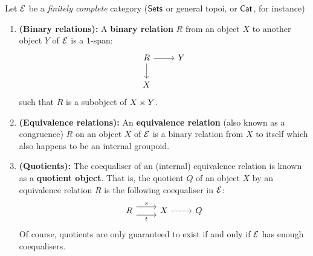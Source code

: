                     \begin{definition} \label{def: equivalence_relations}
                        Let $\mathcal{E}$ be a \textit{finitely complete} category ($\mathsf{Sets}$ or general topoi, or $\mathsf{Cat}$, for instance)
                            \begin{enumerate}
                                \item \textbf{(Binary relations):} A \textbf{binary relation} $R$ from an object $X$ to another object $Y$ of $\mathcal{E}$ is a $1$-span:
                                    $$
                                        \begin{tikzcd}
                                        	R & Y \\
                                        	X
                                        	\arrow[from=1-1, to=2-1]
                                        	\arrow[from=1-1, to=1-2]
                                        \end{tikzcd}
                                    $$
                                such that $R$ is a subobject of $X \x Y$. 
                                \item \textbf{(Equivalence relations):} An \textbf{equivalence relation} (also known as a congruence) $R$ on an object $X$ of $\mathcal{E}$ is a binary relation from $X$ to itself which also happens to be an internal groupoid. 
                                \item \textbf{(Quotients):} The coequaliser of an (internal) equivalence relation is known as a \textbf{quotient object}. That is, the quotient $Q$ of an object $X$ by an equivalence relation $R$ is the following coequaliser in $\mathcal{E}$:
                                    $$
                                        \begin{tikzcd}
                                        	R & X & Q
                                        	\arrow["s", shift left=2, from=1-1, to=1-2]
                                        	\arrow["t"', shift right=2, from=1-1, to=1-2]
                                        	\arrow[dashed, from=1-2, to=1-3]
                                        \end{tikzcd}
                                    $$
                                Of course, quotients are only guaranteed to exist if and only if $\mathcal{E}$ has enough coequalisers. 
                            \end{enumerate}
                    \end{definition}
                    
